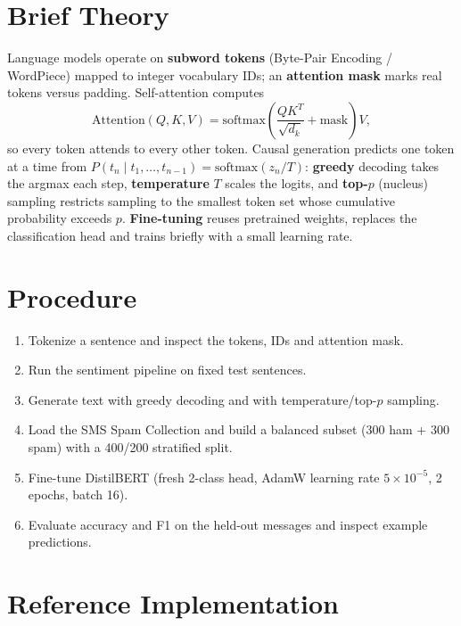 \section{Brief Theory}
Language models operate on \textbf{subword tokens} (Byte-Pair Encoding / WordPiece) mapped to
integer vocabulary IDs; an \textbf{attention mask} marks real tokens versus padding.
Self-attention computes
\[
\mathrm{Attention}(Q,K,V) = \mathrm{softmax}\!\left(\frac{QK^T}{\sqrt{d_k}} + \mathrm{mask}\right) V ,
\]
so every token attends to every other token. Causal generation predicts one token at a time
from $P(t_n \mid t_1, \dots, t_{n-1}) = \mathrm{softmax}(z_n / T)$: \textbf{greedy} decoding
takes the argmax each step, \textbf{temperature} $T$ scales the logits, and \textbf{top-$p$}
(nucleus) sampling restricts sampling to the smallest token set whose cumulative probability
exceeds $p$. \textbf{Fine-tuning} reuses pretrained weights, replaces the classification head
and trains briefly with a small learning rate.

\section{Procedure}
\begin{enumerate}
  \item Tokenize a sentence and inspect the tokens, IDs and attention mask.
  \item Run the sentiment pipeline on fixed test sentences.
  \item Generate text with greedy decoding and with temperature/top-$p$ sampling.
  \item Load the SMS Spam Collection and build a balanced subset (300 ham + 300 spam) with a
        400/200 stratified split.
  \item Fine-tune DistilBERT (fresh 2-class head, AdamW learning rate $5\times10^{-5}$,
        2 epochs, batch 16).
  \item Evaluate accuracy and F1 on the held-out messages and inspect example predictions.
\end{enumerate}

\section{Reference Implementation}


